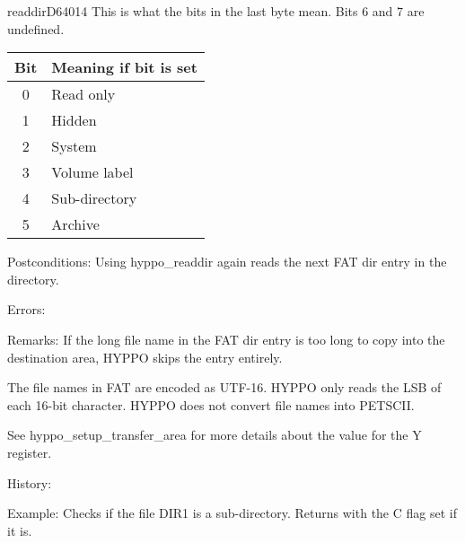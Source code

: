 \begin{hyppotrap}{readdir}{D640}{14}
  This is what the bits in the last byte mean. Bits 6 and 7 are undefined.
  {\setlength{\tabcolsep}{2mm}
  \begin{tabular}{|c|l|}
  \hline
  \textbf{Bit} & \textbf{Meaning if bit is set} \\
  \hline
  0 & Read only         \\
  1 & Hidden            \\
  2 & System            \\
  3 & Volume label      \\
  4 & Sub-directory     \\
  5 & Archive           \\
  \hline
  \end{tabular}
  }
\item [Postconditions:]
  Using hyppo\_readdir again reads the next FAT dir entry in the directory.
\item [Errors:]
\item [Remarks:]
  If the long file name in the FAT dir entry is too long to copy into the
  destination area, HYPPO skips the entry entirely.

  The file names in FAT are encoded as UTF-16. HYPPO only reads the LSB
  of each 16-bit character. HYPPO does not convert file names into
  PETSCII.

  See hyppo\_setup\_transfer\_area for more details about the value for the Y
  register.
\item [History:]
\item [Example:]
  Checks if the file DIR1 is a sub-directory. Returns with the C flag set if it
  is.

  \TODO
\end{hyppotrap}


